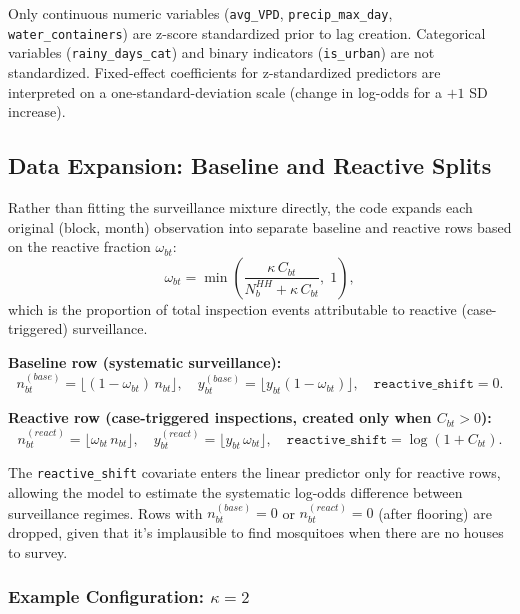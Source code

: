 \documentclass[12pt,a4paper]{article}
\begin{document}
Only continuous numeric variables (\texttt{avg\_VPD}, \texttt{precip\_max\_day}, \texttt{water\_containers}) are z-score standardized prior to lag creation.
Categorical variables (\texttt{rainy\_days\_cat}) and binary indicators (\texttt{is\_urban}) are not standardized.
Fixed-effect coefficients for z-standardized predictors are interpreted on a one-standard-deviation scale (change in log-odds for a $+1$ SD increase).

\subsection{Data Expansion: Baseline and Reactive Splits}
\label{sec:expansion}

Rather than fitting the surveillance mixture directly, the code expands each original (block, month) observation into separate baseline and reactive rows based on the reactive fraction $\omega_{bt}$:
\begin{equation}
\omega_{bt} = \min\!\left(\frac{\kappa\, C_{bt}}{N_b^{HH} + \kappa\, C_{bt}},\; 1\right),
\end{equation}
which is the proportion of total inspection events attributable to reactive (case-triggered) surveillance.

\noindent\textbf{Baseline row (systematic surveillance):}
\begin{equation}
n_{bt}^{(base)} = \lfloor (1 - \omega_{bt})\, n_{bt} \rfloor, \quad y_{bt}^{(base)} = \lfloor y_{bt}(1-\omega_{bt}) \rfloor, \quad \texttt{reactive\_shift} = 0.
\end{equation}

\noindent\textbf{Reactive row (case-triggered inspections, created only when $C_{bt} > 0$):}
\begin{equation}
n_{bt}^{(react)} = \lfloor \omega_{bt}\, n_{bt} \rfloor, \quad y_{bt}^{(react)} = \lfloor y_{bt}\, \omega_{bt} \rfloor, \quad \texttt{reactive\_shift} = \log(1 + C_{bt}).
\end{equation}

The \texttt{reactive\_shift} covariate enters the linear predictor only for reactive rows, allowing the model to estimate the systematic log-odds difference between surveillance regimes.
Rows with $n_{bt}^{(base)} = 0$ or $n_{bt}^{(react)} = 0$ (after flooring) are dropped, given that it's implausible to find mosquitoes when there are no houses to survey. 

\subsubsection{Example Configuration: $\kappa = 2$}
\end{document}
